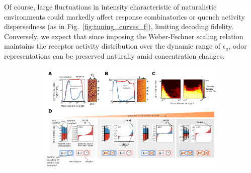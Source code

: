 Of course, large fluctuations in intensity characteristic of naturalistic environments could markedly affect response combinatorics or quench activity dispersedness (as in Fig.~\ref{fig:tuning_curves_f}), limiting decoding fidelity. Conversely, we expect that since imposing the Weber-Fechner scaling relation maintains the receptor activity distribution over the dynamic range of $\epsilon_a$, odor representations can be preserved naturally amid concentration changes.







\begin{figure}[!tb]
	\centering
	\begin{subfigure}[t]{\linewidth}
		\includegraphics[width=\textwidth]{figures/Figures_signal_decoding_weber_law}
		\label{fig:decoding_a}
	\end{subfigure}
	\begin{subfigure}[t]{0\linewidth}
		\label{fig:decoding_b}
	\end{subfigure}
	\begin{subfigure}[t]{0\linewidth}
		\label{fig:decoding_c}
	\end{subfigure}
	\begin{subfigure}[t]{0\linewidth}
		\label{fig:decoding_d}
	\end{subfigure}

\end{figure}
